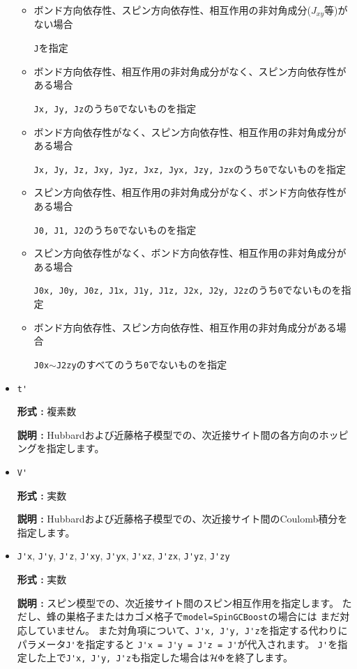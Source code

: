 \begin{itemize}
\begin{itemize}

\item ボンド方向依存性、スピン方向依存性、相互作用の非対角成分($J_{x y}$等)がない場合

\verb|J|を指定

\item ボンド方向依存性、相互作用の非対角成分がなく、スピン方向依存性がある場合

\verb|Jx, Jy, Jz|のうち\verb|0|でないものを指定

\item ボンド方向依存性がなく、スピン方向依存性、相互作用の非対角成分がある場合

\verb|Jx, Jy, Jz, Jxy, Jyz, Jxz, Jyx, Jzy, Jzx|のうち\verb|0|でないものを指定

\item スピン方向依存性、相互作用の非対角成分がなく、ボンド方向依存性がある場合

\verb|J0, J1, J2|のうち\verb|0|でないものを指定

\item スピン方向依存性がなく、ボンド方向依存性、相互作用の非対角成分がある場合

\verb|J0x, J0y, J0z, J1x, J1y, J1z, J2x, J2y, J2z|のうち\verb|0|でないものを指定

\item ボンド方向依存性、スピン方向依存性、相互作用の非対角成分がある場合

\verb|J0x|$\sim$\verb|J2zy|のすべてのうち\verb|0|でないものを指定

\end{itemize}
\item \verb|t'|

{\bf 形式 :} 複素数

{\bf 説明 :} Hubbardおよび近藤格子模型での、次近接サイト間の各方向のホッピングを指定します。

\item \verb|V'|

{\bf 形式 :} 実数

{\bf 説明 :} Hubbardおよび近藤格子模型での、次近接サイト間のCoulomb積分を指定します。

\item \verb|J'x|, \verb|J'y|, \verb|J'z|, \verb|J'xy|, 
  \verb|J'yx|, \verb|J'xz|, \verb|J'zx|, \verb|J'yz|, \verb|J'zy|

{\bf 形式 :} 実数

{\bf 説明 :} スピン模型での、次近接サイト間のスピン相互作用を指定します。
ただし、蜂の巣格子またはカゴメ格子で\verb|model=SpinGCBoost|の場合には
まだ対応していません。
また対角項について、\verb|J'x, J'y, J'z|を指定する代わりに
パラメータ\verb|J'|を指定すると
\verb|J'x = J'y = J'z = J'|が代入されます。
\verb|J'|を指定した上で\verb|J'x, J'y, J'z|も指定した場合は$\mathcal{H} \Phi$を終了します。


\end{itemize}
